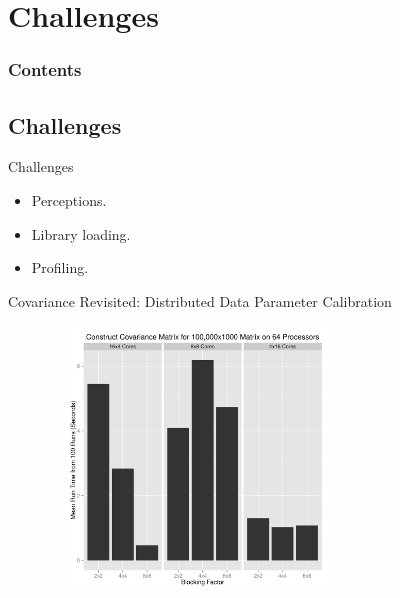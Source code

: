 \section{Challenges}

\hidenum
\begin{frame}[noframenumbering]
\frametitle{Contents}
\end{frame}
\shownum


\subsection{Challenges}

\begin{frame}
  \begin{block}{Challenges}
    \begin{itemize}[<+-|alert@+>]
      \item Perceptions.
      \item Library loading.
      \item Profiling.
    \end{itemize}
  \end{block}
\end{frame}


\begin{frame}
  \begin{block}{Covariance Revisited: Distributed Data Parameter Calibration}
    \begin{center}
     \includegraphics[width=10cm, height=7cm]{../common/pics/cov_param}
    \end{center}
  \end{block}
\end{frame}

